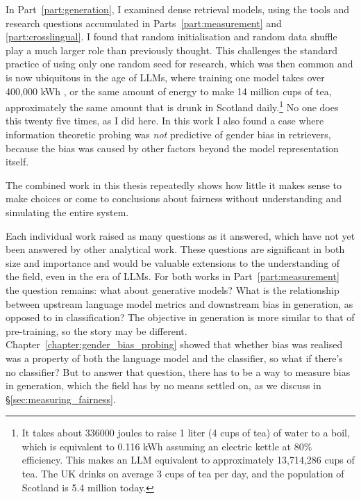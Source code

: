 In Part~\ref{part:generation}, I examined dense retrieval models, using the tools and research questions accumulated in Parts~\ref{part:measurement} and \ref{part:crosslingual}. I found that random initialisation and random data shuffle play a much larger role than previously thought. This challenges the standard practice of using only one random seed for research, which was then common and is now ubiquitous in the age of LLMs, where training one model takes over 400,000 kWh \citep{luccioni_bloom_carbon}, or the same amount of energy to make 14 million cups of tea, approximately the same amount that is drunk in Scotland daily.\footnote{It takes about 336000 joules to raise 1 liter (4 cups of tea) of water to a boil, which is equivalent to 0.116 kWh assuming an electric kettle at 80\% efficiency. This makes an LLM equivalent to approximately 13,714,286 cups of tea. The UK drinks on average 3 cups of tea per day, and the population of Scotland is 5.4 million today.} No one does this twenty five times, as I did here. In this work I also found a case where information theoretic probing was \textit{not} predictive of gender bias in retrievers, because the bias was caused by other factors beyond the model representation itself. 

The combined work in this thesis repeatedly shows how little it makes sense to make choices or come to conclusions about fairness without understanding and simulating the entire system. 

Each individual work raised as many questions as it answered, which have not yet been answered by other analytical work. These questions are significant in both size and importance and would be valuable extensions to the understanding of the field, even in the era of LLMs. For both works in Part~\ref{part:measurement} the question remains: what about generative models?  What is the relationship between upstream language model metrics and downstream bias in generation, as opposed to in classification? The objective in generation is more similar to that of pre-training, so the story may be different. Chapter~\ref{chapter:gender_bias_probing} showed that whether bias was realised was a property of both the language model and the classifier, so what if there's no classifier? 
But to answer that question, there has to be a way to measure bias in generation, which the field has by no means settled on, as we discuss in \S\ref{sec:measuring_fairness}. 

